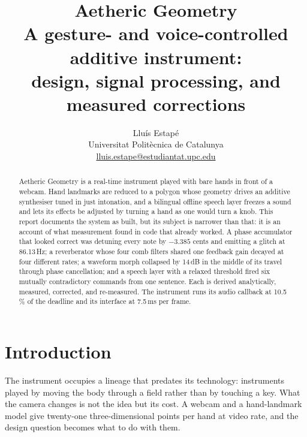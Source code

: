 \documentclass[a4paper,10pt,twocolumn]{article}
\begin{document}
\title{\vspace{-1.2em}\textbf{\LARGE Aetheric Geometry}\\[0.4em]
\large A gesture- and voice-controlled additive instrument:\\
design, signal processing, and measured corrections}

\author{Llu\'is Estap\'e\\
\small Universitat Polit\`ecnica de Catalunya\\
\small \href{mailto:lluis.estape@estudiantat.upc.edu}
            {lluis.estape@estudiantat.upc.edu}}

\date{}

\maketitle

\begin{abstract}
\noindent\small
Aetheric Geometry is a real-time instrument played with bare hands in front of
a webcam. Hand landmarks are reduced to a polygon whose geometry drives an
additive synthesiser tuned in just intonation, and a bilingual offline speech
layer freezes a sound and lets its effects be adjusted by turning a hand as one
would turn a knob. This report documents the system as built, but its subject
is narrower than that: it is an account of what measurement found in code that
already worked. A phase accumulator that looked correct was detuning every note
by $-3.385$ cents and emitting a glitch at 86.13\,Hz; a reverberator whose four
comb filters shared one feedback gain decayed at four different rates; a
waveform morph collapsed by 14\,dB in the middle of its travel through phase
cancellation; and a speech layer with a relaxed threshold fired six mutually
contradictory commands from one sentence. Each is derived analytically,
measured, corrected, and re-measured. The instrument runs its audio callback at
10.5\,\% of the deadline and its interface at 7.5\,ms per frame.
\end{abstract}

\section{Introduction}

The instrument occupies a lineage that predates its technology: instruments
played by moving the body through a field rather than by touching a key. What
the camera changes is not the idea but its cost. A webcam and a hand-landmark
model give twenty-one three-dimensional points per hand at video rate, and the
design question becomes what to do with them.
\end{document}
